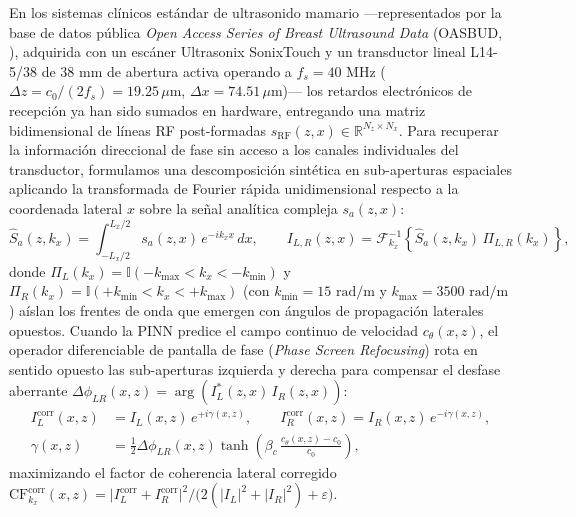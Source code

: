 \documentclass[9pt]{article}
\begin{document}
En los sistemas clínicos estándar de ultrasonido mamario —representados por la base de datos pública \textit{Open Access Series of Breast Ultrasound Data} (OASBUD, \cite{Piotrzkowska2017}), adquirida con un escáner Ultrasonix SonixTouch y un transductor lineal L14-5/38 de $38\text{ mm}$ de abertura activa operando a $f_s = 40\text{ MHz}$ ($\Delta z = c_0/(2f_s) = 19.25\,\mu\text{m}$, $\Delta x = 74.51\,\mu\text{m}$)— los retardos electrónicos de recepción ya han sido sumados en hardware, entregando una matriz bidimensional de líneas RF post-formadas $s_{\text{RF}}(z, x) \in \mathbb{R}^{N_z \times N_x}$. Para recuperar la información direccional de fase sin acceso a los canales individuales del transductor, formulamos una descomposición sintética en sub-aperturas espaciales aplicando la transformada de Fourier rápida unidimensional respecto a la coordenada lateral $x$ sobre la señal analítica compleja $s_a(z, x)$:
\begin{equation}
\hat{S}_a(z, k_x) = \int_{-L_x/2}^{L_x/2} s_a(z, x)\,e^{-i k_x x}\,dx, \qquad I_{L,R}(z, x) = \mathcal{F}_{k_x}^{-1}\!\left\{\hat{S}_a(z, k_x)\,\Pi_{L,R}(k_x)\right\},
\label{eq:kx_subapertures}
\end{equation}
donde $\Pi_L(k_x) = \mathbb{I}(-k_{\max} < k_x < -k_{\min})$ y $\Pi_R(k_x) = \mathbb{I}(+k_{\min} < k_x < +k_{\max})$ (con $k_{\min} = 15\text{ rad/m}$ y $k_{\max} = 3500\text{ rad/m}$) aíslan los frentes de onda que emergen con ángulos de propagación laterales opuestos. Cuando la PINN predice el campo continuo de velocidad $c_\theta(x, z)$, el operador diferenciable de pantalla de fase (\textit{Phase Screen Refocusing}) rota en sentido opuesto las sub-aperturas izquierda y derecha para compensar el desfase aberrante $\Delta\phi_{LR}(x, z) = \arg\!\left(I_L^*(z,x)\,I_R(z,x)\right)$:
\begin{equation}
\begin{aligned}
I_L^{\text{corr}}(x, z) &= I_L(x, z)\,e^{+i\gamma(x, z)}, \qquad I_R^{\text{corr}}(x, z) = I_R(x, z)\,e^{-i\gamma(x, z)}, \\
\gamma(x, z) &= \frac{1}{2}\Delta\phi_{LR}(x, z)\tanh\!\left(\beta_c\,\frac{c_\theta(x,z) - c_0}{c_0}\right),
\end{aligned}
\label{eq:kx_phase_screen}
\end{equation}
maximizando el factor de coherencia lateral corregido $\text{CF}_{k_x}^{\text{corr}}(x, z) = \lvert I_L^{\text{corr}} + I_R^{\text{corr}}\rvert^2 / \big(2(\lvert I_L\rvert^2 + \lvert I_R\rvert^2) + \varepsilon\big)$.
\end{document}
